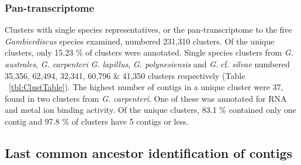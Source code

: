 \documentclass[12pt]{article}
\begin{document}
\subsubsection*{Pan-transcriptome}
Clusters with single species representatives, or the pan-transcriptome to the five \textit{Gambierdiscus} species examined, numbered 231,310 clusters. 
Of the unique clusters, only 15.23 \% of clusters were annotated. 
Single species clusters from \emph{G. australes}, \textit{G. carpenteri} \textit{G. lapillus}, \textit{G. polynesiensis} and \textit{G.} cf. \textit{silvae} numbered 35,356, 62,494, 32,341, 60,796 \& 41,350 clusters respectively (Table ~\ref{tbl:ClustTable}). 
The highest number of contigs in a unique cluster were 37, found in two clusters from \textit{G. carpenteri}. 
One of these was annotated for RNA and metal ion binding activity. 
Of the unique clusters, 83.1 \% contained only one contig and 97.8 \% of clusters have 5 contigs or less. 

\subsection*{Last common ancestor identification of contigs}
\end{document}
